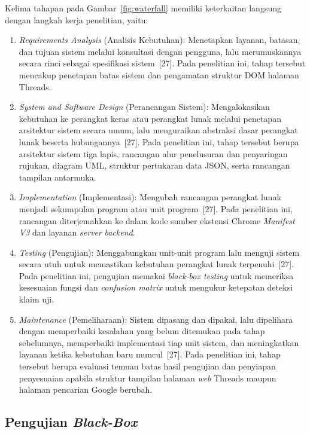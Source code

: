 \documentclass[12pt,a4paper,twoside]{report}
\begin{document}
Kelima tahapan pada Gambar~\ref{fig:waterfall} memiliki keterkaitan langsung dengan langkah kerja penelitian, yaitu:
\begin{enumerate}[leftmargin=0.8cm,itemsep=2pt,topsep=2pt]
  \item \textit{Requirements Analysis} (Analisis Kebutuhan): Menetapkan layanan, batasan, dan tujuan sistem melalui konsultasi dengan pengguna, lalu merumuskannya secara rinci sebagai spesifikasi sistem~[27]. Pada penelitian ini, tahap tersebut mencakup penetapan batas sistem dan pengamatan struktur DOM halaman Threads.
  \item \textit{System and Software Design} (Perancangan Sistem): Mengalokasikan kebutuhan ke perangkat keras atau perangkat lunak melalui penetapan arsitektur sistem secara umum, lalu menguraikan abstraksi dasar perangkat lunak beserta hubungannya~[27]. Pada penelitian ini, tahap tersebut berupa arsitektur sistem tiga lapis, rancangan alur penelusuran dan penyaringan rujukan, diagram UML, struktur pertukaran data JSON, serta rancangan tampilan antarmuka.
  \item \textit{Implementation} (Implementasi): Mengubah rancangan perangkat lunak menjadi sekumpulan program atau unit program~[27]. Pada penelitian ini, rancangan diterjemahkan ke dalam kode sumber ekstensi Chrome \textit{Manifest V3} dan layanan \textit{server} \textit{backend}.
  \item \textit{Testing} (Pengujian): Menggabungkan unit-unit program lalu menguji sistem secara utuh untuk memastikan kebutuhan perangkat lunak terpenuhi~[27]. Pada penelitian ini, pengujian memakai \textit{black-box testing} untuk memeriksa kesesuaian fungsi dan \textit{confusion matrix} untuk mengukur ketepatan deteksi klaim uji.
  \item \textit{Maintenance} (Pemeliharaan): Sistem dipasang dan dipakai, lalu dipelihara dengan memperbaiki kesalahan yang belum ditemukan pada tahap sebelumnya, memperbaiki implementasi tiap unit sistem, dan meningkatkan layanan ketika kebutuhan baru muncul~[27]. Pada penelitian ini, tahap tersebut berupa evaluasi temuan batas hasil pengujian dan penyiapan penyesuaian apabila struktur tampilan halaman \textit{web} Threads maupun halaman pencarian Google berubah.
\end{enumerate}

\subsection{Pengujian \textit{Black-Box}}
\end{document}
